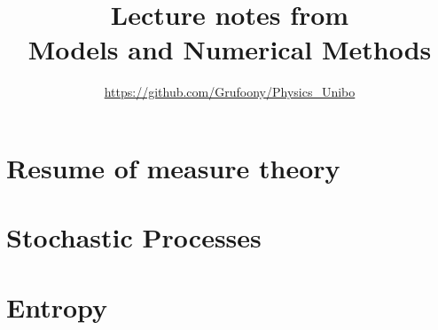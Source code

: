 \documentclass[12pt]{article}
\title{Lecture notes from \\ Models and Numerical Methods} \author{\url{https://github.com/Grufoony/Physics_Unibo}}
\date{}
\begin{document}
\maketitle

\newpage
\thispagestyle{empty}
\addtocounter{page}{-2}
\mbox{}

\tableofcontents
\pagebreak


\section{Resume of measure theory}

\pagebreak

\section{Stochastic Processes}

\pagebreak

\section{Entropy}

\pagebreak
\end{document}
